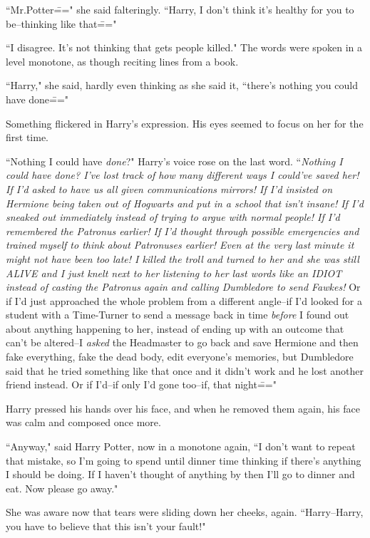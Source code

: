 ``Mr.\?Potter\===" she said falteringly. ``Harry, I don't think it's healthy for you to be\---thinking like that\==="

``I disagree. It's not thinking that gets people killed." The words were spoken in a level monotone, as though reciting lines from a book.

``Harry," she said, hardly even thinking as she said it, ``there's nothing you could have done\==="

Something flickered in Harry's expression. His eyes seemed to focus on her for the first time.

``Nothing I could have \emph{done}?" Harry's voice rose on the last word. ``\emph{Nothing I could have \emph{done}? I've lost track of how many different ways I could've saved her! If I'd asked to have us all given communications mirrors! If I'd insisted on Hermione being taken out of Hogwarts and put in a school that isn't insane! If I'd sneaked out immediately instead of trying to argue with normal people! If I'd remembered the Patronus earlier! If I'd thought through possible emergencies and trained myself to think about Patronuses earlier! Even at the very last minute it might not have been too late! I killed the troll and turned to her and she was still ALIVE and I just knelt next to her listening to her last words like an IDIOT instead of casting the Patronus again and calling Dumbledore to send Fawkes!} Or if I'd just approached the whole problem from a different angle\---if I'd looked for a student with a Time-Turner to send a message back in time \emph{before} I found out about anything happening to her, instead of ending up with an outcome that can't be altered\---I \emph{asked} the Headmaster to go back and save Hermione and then fake everything, fake the dead body, edit everyone's memories, but Dumbledore said that he tried something like that once and it didn't work and he lost another friend instead. Or if I'd\---if only I'd gone too\---if, that night\==="

Harry pressed his hands over his face, and when he removed them again, his face was calm and composed once more.

``Anyway," said Harry Potter, now in a monotone again, ``I don't want to repeat that mistake, so I'm going to spend until dinner time thinking if there's anything I should be doing. If I haven't thought of anything by then I'll go to dinner and eat. Now please go away."

She was aware now that tears were sliding down her cheeks, again. ``Harry\---Harry, you have to believe that this isn't your fault!"

